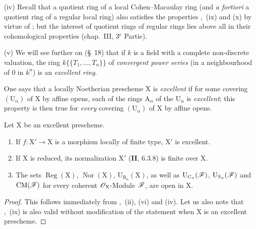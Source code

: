 \begin{remarks}[7.8.4]
(iv) Recall that a quotient ring of a local Cohen--Macaulay ring (and \emph{a fortiori} a quotient ring of a regular local ring) also satisfies the properties ,~(ix) and (x) by virtue of ; but the interest of quotient rings of regular rings lies above all in their cohomological properties (chap.~III, 3${}^{\text{e}}$ Partie).

(v) We will see further on (\S~18) that if $k$ is a field with a complete non-discrete valuation, the ring $k\{\!\{T_1,\ldots,T_n\}\!\}$ of \emph{convergent power series} (in a neighbourhood of $0$ in $k^n$) is an \emph{excellent ring}.
\end{remarks}

\begin{env}[7.8.5]
\label{IV.7.8.5}
One says that a locally Noetherian prescheme $\mathrm{X}$ is \emph{excellent} if for some covering $(\mathrm{U}_\alpha)$ of $\mathrm{X}$ by affine opens, each of the rings $\mathrm{A}_\alpha$ of the $\mathrm{U}_\alpha$ is \emph{excellent}; this property is then true for \emph{every} covering $(\mathrm{U}_\alpha)$ of $\mathrm{X}$ by affine opens.
\end{env}

\begin{proposition}[7.8.6]
\label{IV.7.8.6}
Let $\mathrm{X}$ be an excellent prescheme.
\begin{enumerate}[label=(\roman*)]
  \item If $f:\mathrm{X}'\to\mathrm{X}$ is a morphism locally of finite type, $\mathrm{X}'$ is excellent.


  \item If $\mathrm{X}$ is reduced, its normalization $\mathrm{X}'$ \textup{(\textbf{II}, $6.3.8$)} is finite over $\mathrm{X}$.
  \item The sets $\operatorname{Reg}(\mathrm{X})$, $\operatorname{Nor}(\mathrm{X})$, $\mathrm{U}_{\mathrm{R}_n}(\mathrm{X})$, as well as $\mathrm{U}_{\mathrm{C}_n}(\mathscr{F})$, $\mathrm{U}_{\mathrm{S}_n}(\mathscr{F})$ and $\mathrm{CM}(\mathscr{F})$ for every coherent $\mathscr{O}_\mathrm{X}$-Module $\mathscr{F}$, are open in $\mathrm{X}$.
\end{enumerate}
\end{proposition}

\begin{proof}
This follows immediately from ,~(ii), (vi) and (iv). Let us also note that ,~(ix) is also valid without modification of the statement when $\mathrm{X}$ is an excellent prescheme.
\end{proof}


